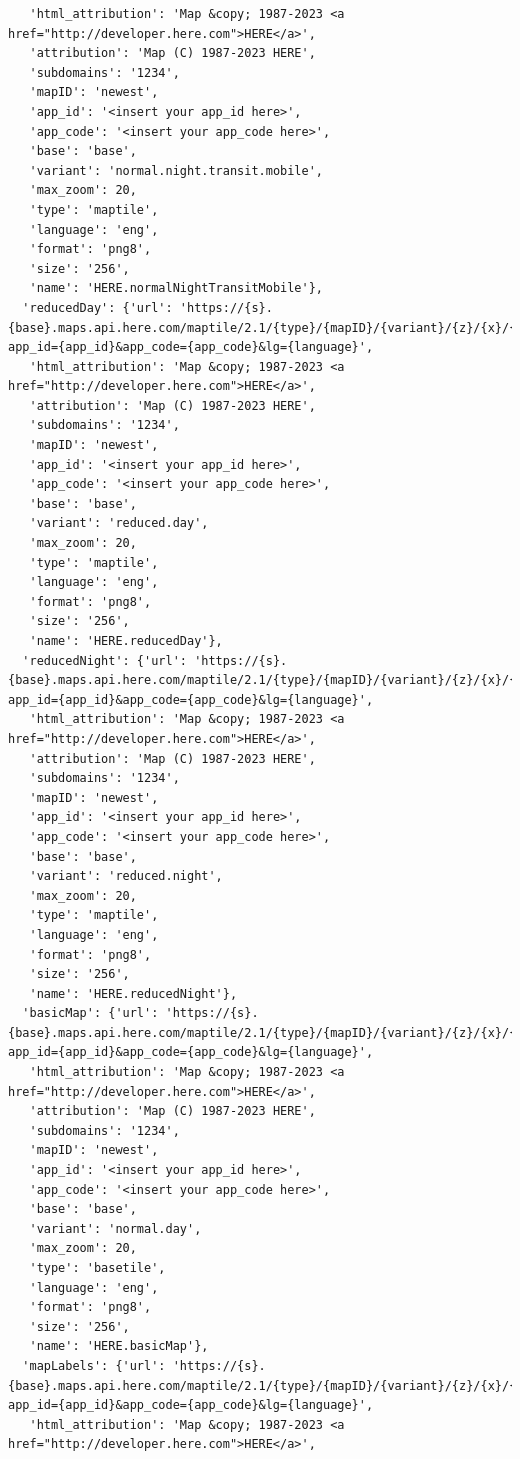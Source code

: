 \documentclass[
  letterpaper,
  DIV=11,
  numbers=noendperiod]{scrreprt}
\begin{document}
\begin{verbatim}
   'html_attribution': 'Map &copy; 1987-2023 <a href="http://developer.here.com">HERE</a>',
   'attribution': 'Map (C) 1987-2023 HERE',
   'subdomains': '1234',
   'mapID': 'newest',
   'app_id': '<insert your app_id here>',
   'app_code': '<insert your app_code here>',
   'base': 'base',
   'variant': 'normal.night.transit.mobile',
   'max_zoom': 20,
   'type': 'maptile',
   'language': 'eng',
   'format': 'png8',
   'size': '256',
   'name': 'HERE.normalNightTransitMobile'},
  'reducedDay': {'url': 'https://{s}.{base}.maps.api.here.com/maptile/2.1/{type}/{mapID}/{variant}/{z}/{x}/{y}/{size}/{format}?app_id={app_id}&app_code={app_code}&lg={language}',
   'html_attribution': 'Map &copy; 1987-2023 <a href="http://developer.here.com">HERE</a>',
   'attribution': 'Map (C) 1987-2023 HERE',
   'subdomains': '1234',
   'mapID': 'newest',
   'app_id': '<insert your app_id here>',
   'app_code': '<insert your app_code here>',
   'base': 'base',
   'variant': 'reduced.day',
   'max_zoom': 20,
   'type': 'maptile',
   'language': 'eng',
   'format': 'png8',
   'size': '256',
   'name': 'HERE.reducedDay'},
  'reducedNight': {'url': 'https://{s}.{base}.maps.api.here.com/maptile/2.1/{type}/{mapID}/{variant}/{z}/{x}/{y}/{size}/{format}?app_id={app_id}&app_code={app_code}&lg={language}',
   'html_attribution': 'Map &copy; 1987-2023 <a href="http://developer.here.com">HERE</a>',
   'attribution': 'Map (C) 1987-2023 HERE',
   'subdomains': '1234',
   'mapID': 'newest',
   'app_id': '<insert your app_id here>',
   'app_code': '<insert your app_code here>',
   'base': 'base',
   'variant': 'reduced.night',
   'max_zoom': 20,
   'type': 'maptile',
   'language': 'eng',
   'format': 'png8',
   'size': '256',
   'name': 'HERE.reducedNight'},
  'basicMap': {'url': 'https://{s}.{base}.maps.api.here.com/maptile/2.1/{type}/{mapID}/{variant}/{z}/{x}/{y}/{size}/{format}?app_id={app_id}&app_code={app_code}&lg={language}',
   'html_attribution': 'Map &copy; 1987-2023 <a href="http://developer.here.com">HERE</a>',
   'attribution': 'Map (C) 1987-2023 HERE',
   'subdomains': '1234',
   'mapID': 'newest',
   'app_id': '<insert your app_id here>',
   'app_code': '<insert your app_code here>',
   'base': 'base',
   'variant': 'normal.day',
   'max_zoom': 20,
   'type': 'basetile',
   'language': 'eng',
   'format': 'png8',
   'size': '256',
   'name': 'HERE.basicMap'},
  'mapLabels': {'url': 'https://{s}.{base}.maps.api.here.com/maptile/2.1/{type}/{mapID}/{variant}/{z}/{x}/{y}/{size}/{format}?app_id={app_id}&app_code={app_code}&lg={language}',
   'html_attribution': 'Map &copy; 1987-2023 <a href="http://developer.here.com">HERE</a>',

\end{verbatim}
\end{document}
